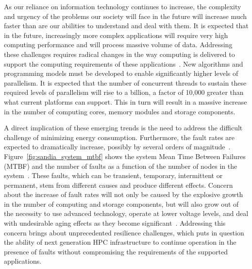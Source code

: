 As our reliance on information technology continues to increase, the complexity and urgency of the problems our society will face in the future will increase much faster than are our abilities to understand and deal with them. It is expected that in the future, increasingly more complex applications will require very high computing performance and will process massive volume of data. Addressing these challenges requires radical changes in the way computing is delivered to support the computing requirements of these applications~\cite{sachs_ascr_2011}. New algorithms and programming models must be developed to enable significantly higher levels of parallelism. It is expected that the number of concurrent threads to sustain these required levels of parallelism will rise to a billion, a factor of 10,000 greater than what current platforms can support. This in turn will result in a massive increase in the number of computing cores, memory modules and storage components.

A direct implication of these emerging trends is the need to address the difficult challenge of minimizing energy consumption. Furthermore, the fault rates are expected to dramatically increase, possibly by several orders of magnitude~\cite{srinivasan_dsn_2004,torrellas2009architectures}. Figure~\ref{fig:sandia_system_mtbf} shows the system Mean Time Between Failures (MTBF) and the number of faults as a function of the number of nodes in the system~\cite{riesen_sandia_2010}. These faults, which can be transient, temporary, intermittent or permanent, stem from different causes and produce different effects. Concern about the increase of fault rates will not only be caused by the explosive growth in the number of computing and storage components, but will also grow out of the necessity to use advanced technology, operate at lower voltage levels, and deal with undesirable aging effects as they become significant~\cite{plank1995compressed}. Addressing this concern brings about unprecedented resilience challenges, which puts in question the ability of next generation HPC infrastructure to continue operation in the presence of faults without compromising the requirements of the supported applications. 


